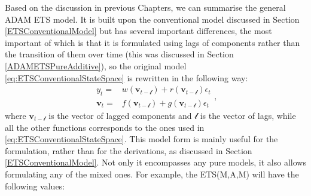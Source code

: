 \documentclass[
]{book}
\theoremstyle{definition}
\theoremstyle{definition}
\theoremstyle{definition}
\theoremstyle{definition}
\theoremstyle{remark}
\begin{document}
Based on the discussion in previous Chapters, we can summarise the general ADAM ETS model. It is built upon the conventional model discussed in Section \ref{ETSConventionalModel} but has several important differences, the most important of which is that it is formulated using lags of components rather than the transition of them over time (this was discussed in Section \ref{ADAMETSPureAdditive}), so the original model \eqref{eq:ETSConventionalStateSpace} is rewritten in the following way:
\begin{equation}
  \begin{aligned}
    {y}_{t} = &w(\mathbf{v}_{t-\boldsymbol{\mathscr{l}}}) + r(\mathbf{v}_{t-\boldsymbol{\mathscr{l}}}) \epsilon_t \\
    \mathbf{v}_{t} = &f(\mathbf{v}_{t-\boldsymbol{\mathscr{l}}}) + g(\mathbf{v}_{t-\boldsymbol{\mathscr{l}}}) \epsilon_t
  \end{aligned},
  \label{eq:ETSADAMStateSpace}
\end{equation}
where \(\mathbf{v}_{t-\boldsymbol{\mathscr{l}}}\) is the vector of lagged components and \(\boldsymbol{\mathscr{l}}\) is the vector of lags, while all the other functions corresponds to the ones used in \eqref{eq:ETSConventionalStateSpace}. This model form is mainly useful for the formulation, rather than for the derivations, as discussed in Section \ref{ETSConventionalModel}. Not only it encompasses any pure models, it also allows formulating any of the mixed ones. For example, the ETS(M,A,M) will have the following values:
\end{document}
